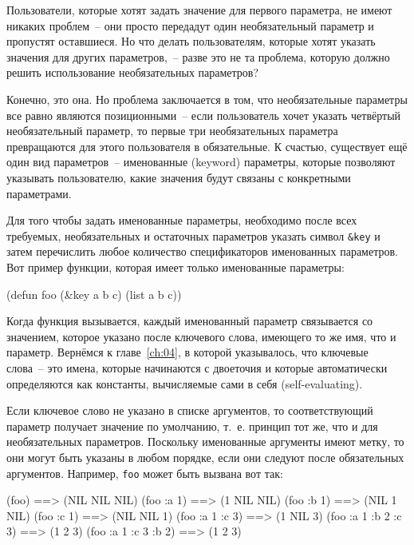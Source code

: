 Пользователи, которые хотят задать значение для первого параметра, не имеют никаких
проблем~-- они просто передадут один необязательный параметр и пропустят оставшиеся.  Но
что делать пользователям, которые хотят указать значения для других параметров,~-- разве
это не та проблема, которую должно решить использование необязательных параметров?

Конечно, это она.  Но проблема заключается в том, что необязательные параметры все равно
являются позиционными~-- если пользователь хочет указать четвёртый необязательный
параметр, то первые три необязательных параметра превращаются для этого пользователя в
обязательные.  К счастью, существует ещё один вид параметров~-- именованные (keyword)
параметры, которые позволяют указывать пользователю, какие значения будут связаны с
конкретными параметрами.

Для того чтобы задать именованные параметры, необходимо после всех требуемых,
необязательных и остаточных параметров указать символ \lstinline!&key! и затем
перечислить любое количество спецификаторов именованных параметров.  Вот пример функции,
которая имеет только именованные параметры:

\begin{myverb}
(defun foo (&key a b c) 
  (list a b c))
\end{myverb}

Когда функция вызывается, каждый именованный параметр связывается со значением, которое
указано после ключевого слова, имеющего то же имя, что и параметр.  Вернёмся к
главе~\ref{ch:04}, в которой указывалось, что ключевые слова~-- это имена, которые
начинаются с двоеточия и которые автоматически определяются как константы, вычисляемые
сами в себя (self-evaluating).

Если ключевое слово не указано в списке аргументов, то соответствующий параметр получает
значение по умолчанию, т.~е. принцип тот же, что и для необязательных параметров.
Поскольку именованные аргументы имеют метку, то они могут быть указаны в любом порядке,
если они следуют после обязательных аргументов.  Например, \lstinline{foo} может быть вызвана
вот так:

\begin{myverb}
(foo)                ==> (NIL NIL NIL)
(foo :a 1)           ==> (1 NIL NIL)
(foo :b 1)           ==> (NIL 1 NIL)
(foo :c 1)           ==> (NIL NIL 1)
(foo :a 1 :c 3)      ==> (1 NIL 3)
(foo :a 1 :b 2 :c 3) ==> (1 2 3)
(foo :a 1 :c 3 :b 2) ==> (1 2 3)
\end{myverb}

